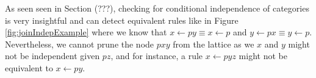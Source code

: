 

As seen seen in Section (???), checking for conditional independence of categories is very insightful and
can detect equivalent rules like in Figure \ref{fig:joinIndepExample} where we know that $x \leftarrow py \equiv x
\leftarrow p$ and $y \leftarrow px \equiv y \leftarrow p$. Nevertheless, we cannot prune the node $pxy$ from the
lattice as we $x$ and $y$ might not be independent given $pz$, and for instance, a rule $x \leftarrow pyz$ might not be
equivalent to $x \leftarrow py$. 



